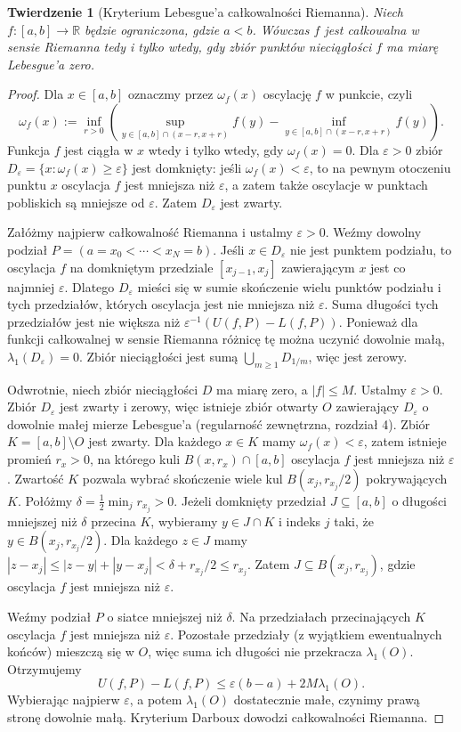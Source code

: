 \documentclass[11pt,a4paper,oneside]{book}
\numberwithin{equation}{chapter}
\theoremstyle{plain}
\newtheorem{twierdzenie}{Twierdzenie}[chapter]
\theoremstyle{definition}
\theoremstyle{remark}
\begin{document}
\begin{twierdzenie}[Kryterium Lebesgue'a całkowalności Riemanna]
\label{thm:riemann-criterion}
Niech $f:[a,b]\to\mathbb R$ będzie ograniczona, gdzie
$a<b$. Wówczas $f$ jest całkowalna w sensie Riemanna
tedy i tylko wtedy, gdy zbiór punktów nieciągłości $f$
ma miarę Lebesgue'a zero.
\end{twierdzenie}
\begin{proof}
Dla $x\in[a,b]$ oznaczmy przez $\omega_f(x)$
oscylację $f$ w punkcie, czyli
\[
\omega_f(x):=\inf_{r>0}
\left(\sup_{y\in[a,b]\cap(x-r,x+r)}f(y)
-\inf_{y\in[a,b]\cap(x-r,x+r)}f(y)\right).
\]
Funkcja $f$ jest ciągła w $x$ wtedy i tylko wtedy,
gdy $\omega_f(x)=0$. Dla $\varepsilon>0$ zbiór
$D_\varepsilon=\{x:\omega_f(x)\ge\varepsilon\}$
jest domknięty: jeśli $\omega_f(x)<\varepsilon$,
to na pewnym otoczeniu punktu $x$ oscylacja $f$
jest mniejsza niż $\varepsilon$, a zatem także
oscylacje w punktach pobliskich są mniejsze od
$\varepsilon$. Zatem $D_\varepsilon$ jest zwarty.

Załóżmy najpierw całkowalność Riemanna i
ustalmy $\varepsilon>0$. Weźmy dowolny podział
$P=(a=x_0<\cdots<x_N=b)$. Jeśli
$x\in D_\varepsilon$ nie jest punktem podziału,
to oscylacja $f$ na domkniętym przedziale
$[x_{j-1},x_j]$ zawierającym $x$ jest co najmniej
$\varepsilon$. Dlatego $D_\varepsilon$ mieści się
w sumie skończenie wielu punktów podziału i tych
przedziałów, których oscylacja jest nie mniejsza
niż $\varepsilon$. Suma długości tych przedziałów
jest nie większa niż
$\varepsilon^{-1}(U(f,P)-L(f,P))$.
Ponieważ dla funkcji całkowalnej w sensie Riemanna
różnicę tę można uczynić dowolnie małą,
$\lambda_1(D_\varepsilon)=0$.
Zbiór nieciągłości jest sumą
$\bigcup_{m\ge1}D_{1/m}$, więc jest zerowy.

Odwrotnie, niech zbiór nieciągłości $D$ ma miarę
zero, a $|f|\le M$. Ustalmy $\varepsilon>0$.
Zbiór $D_\varepsilon$ jest zwarty i zerowy, więc
istnieje zbiór otwarty $O$ zawierający $D_\varepsilon$
o dowolnie małej mierze Lebesgue'a (regularność
zewnętrzna, rozdział 4). Zbiór
$K=[a,b]\setminus O$ jest zwarty. Dla każdego
$x\in K$ mamy $\omega_f(x)<\varepsilon$,
zatem istnieje promień $r_x>0$, na którego kuli
$B(x,r_x)\cap[a,b]$ oscylacja $f$ jest
mniejsza niż $\varepsilon$. Zwartość $K$ pozwala
wybrać skończenie wiele kul $B(x_j,r_{x_j}/2)$
pokrywających $K$. Połóżmy
$\delta=\frac12\min_j r_{x_j}>0$.
Jeżeli domknięty przedział $J\subseteq[a,b]$
o długości mniejszej niż $\delta$ przecina $K$,
wybieramy $y\in J\cap K$ i indeks $j$ taki, że
$y\in B(x_j,r_{x_j}/2)$. Dla każdego $z\in J$
mamy
$|z-x_j|\le|z-y|+|y-x_j|<\delta+r_{x_j}/2
\le r_{x_j}$.
Zatem $J\subseteq B(x_j,r_{x_j})$, gdzie
oscylacja $f$ jest mniejsza niż $\varepsilon$.

Weźmy podział $P$ o siatce mniejszej niż $\delta$.
Na przedziałach przecinających $K$ oscylacja $f$
jest mniejsza niż $\varepsilon$. Pozostałe
przedziały (z wyjątkiem ewentualnych końców)
mieszczą się w $O$, więc suma ich długości
nie przekracza $\lambda_1(O)$. Otrzymujemy
\[
U(f,P)-L(f,P)
\le\varepsilon(b-a)+2M\lambda_1(O).
\]
Wybierając najpierw $\varepsilon$, a potem
$\lambda_1(O)$ dostatecznie małe, czynimy prawą
stronę dowolnie małą. Kryterium Darboux dowodzi
całkowalności Riemanna.
\end{proof}
\end{document}
